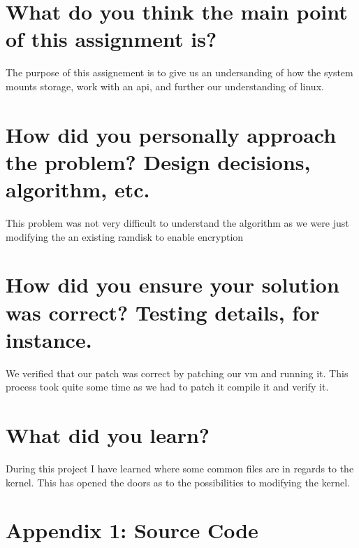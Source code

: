 \documentclass[letterpaper,10pt]{article}
\begin{document}
\tableofcontents


\newpage

\section{What do you think the main point of this assignment is?} 
The purpose of this assignement is to give us an undersanding of how the system mounts storage, work with an api, and further our understanding of linux.
\section{How did you personally approach the problem? Design decisions, algorithm, etc.}
This problem was not very difficult to understand the algorithm as we were just modifying the an existing ramdisk to enable encryption 
\section{How did you ensure your solution was correct? Testing details, for instance.}
We verified that our patch was correct by patching our vm and running it. This process took quite some time as we had to patch it compile it and verify it. 
\section{What did you learn?}
During this project I have learned where some common files are in regards to the kernel. This has opened the doors as to the possibilities to modifying the kernel.

\newpage

\section*{Appendix 1: Source Code}
%
\end{document}
